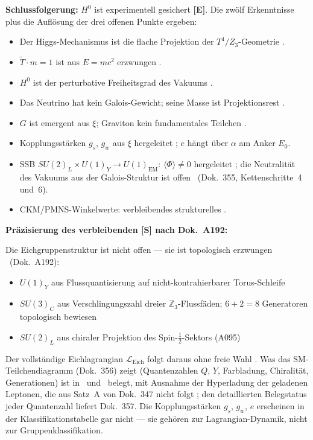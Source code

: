 \textbf{Schlussfolgerung:}
$H^0$ ist experimentell gesichert \textbf{[E]}. Die zwölf Erkenntnisse plus die
Auflösung der drei offenen Punkte ergeben:
\begin{itemize}
  \item Der Higgs-Mechanismus ist die flache Projektion der $T^4/Z_3$-Geometrie \BM.
  \item $\tilde{T}\cdot m = 1$ ist aus $E = mc^2$ erzwungen \BM.
  \item $H^0$ ist der perturbative Freiheitsgrad des Vakuums \BM.
  \item Das Neutrino hat kein Galois-Gewicht; seine Masse ist Projektionsrest \BM.
  \item $G$ ist emergent aus $\xi$; Graviton kein fundamentales Teilchen \KM.
  \item Kopplungsstärken $g_s$, $g_w$ aus $\xi$ hergeleitet \KM; $e$ hängt über
    $\alpha$ am Anker $E_0$.
  \item SSB $SU(2)_L\times U(1)_Y\to U(1)_\text{EM}$: $\langle\Phi\rangle\neq0$
    hergeleitet \BM; die Neutralität des Vakuums aus der Galois-Struktur ist offen
    \SM\ (Dok.~355, Kettenschritte~4 und~6).
  \item CKM/PMNS-Winkelwerte: verbleibendes strukturelles \SM.
\end{itemize}

\textbf{Präzisierung des verbleibenden [S] nach Dok.~A192:}

Die Eichgruppenstruktur ist nicht offen --- sie ist topologisch erzwungen
\BM\ (Dok.~A192):
\begin{itemize}
  \item $U(1)_Y$ aus Flussquantisierung auf nicht-kontrahierbarer Torus-Schleife \BM
  \item $SU(3)_C$ aus Verschlingungszahl dreier $\mathbb{Z}_3$-Flussfäden;
    $6+2=8$ Generatoren topologisch bewiesen \BM
  \item $SU(2)_L$ aus chiraler Projektion des Spin-$\tfrac{1}{2}$-Sektors (A095) \BM
\end{itemize}

Der vollständige Eichlagrangian $\mathcal{L}_\text{Eich}$ folgt daraus ohne
freie Wahl \BM. Was das SM-Teilchendiagramm (Dok.~356) zeigt
(Quantenzahlen $Q$, $Y$, Farbladung, Chiralität, Generationen) ist
in \BM\ und \KM\ belegt, mit Ausnahme der Hyperladung der geladenen
Leptonen, die aus Satz~A von Dok.~347 nicht folgt \SM; den detaillierten
Belegstatus jeder Quantenzahl liefert Dok.~357. Die Kopplungsstärken
$g_s$, $g_w$, $e$ erscheinen in der Klassifikationstabelle gar nicht --- sie
gehören zur Lagrangian-Dynamik, nicht zur Gruppenklassifikation.

